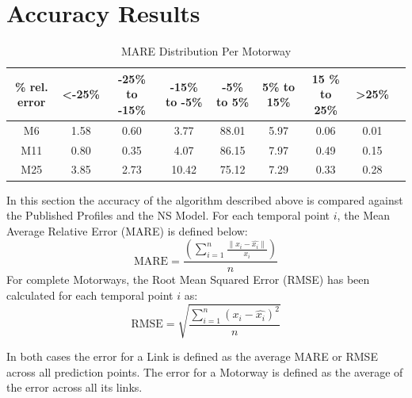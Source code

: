 \documentclass[letterpaper, 10 pt, conference]{ieeeconf}  %
\begin{document}
\section{Accuracy Results}
\begin{table}[bp]
	\caption{MARE Distribution Per Motorway}
	\centering
	\begin{center}
		\begin{tabular}{|C|C|C|C|C|C|C|C|C|}
			\hline
			\textbf{\% rel. error}&{\textless -25\%}&{-25\%\textbf{ to }-15\%}&{-15\%\textbf{ to }-5\%}&{-5\%\textbf{ to }5\%}&{5\%\textbf{ to }15\%}&{15 \%\textbf{ to }25\%}&{\textgreater 25\%}\\
			\hline
			M6& 1.58& 0.60& 3.77& 88.01& 5.97& 0.06& 0.01\\
			\hline
			M11& 0.80& 0.35& 4.07& 86.15& 7.97& 0.49& 0.15\\
			\hline
			M25& 3.85& 2.73& 10.42& 75.12& 7.29& 0.33& 0.28\\
			\hline
		\end{tabular}
		\label{mapeglobal}
	\end{center}
\end{table}
  
In this section the accuracy of the algorithm described above is compared against the Published Profiles and the NS Model. 
For each temporal point $i$, the Mean Average Relative Error (MARE) is defined below:
\begin{equation}
\textrm{MARE} =\frac{ \left( \sum_{i=1}^{n} \frac{\|x_i - \hat{x_i}\|}{x_i}\right)}{n}
\end{equation}
For complete Motorways, the Root Mean Squared Error (RMSE) has been calculated for each temporal point $i$ as:
\begin{equation}
\textrm{RMSE} = \sqrt{\frac{\sum_{i=1}^{n} (x_i - \hat{x_i})^2}{n}}
\end{equation}

In both cases the error for a Link is defined as the average MARE or RMSE across all prediction points.
The error for a Motorway is defined as the average of the error across all its links.

\end{document}
